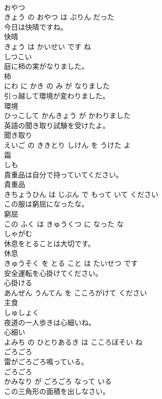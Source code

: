 \documentclass[8pt]{extreport}
\begin{document}
\begin{CJK}{UTF8}{min}
\\	おやつ 
\\	きょう の おやつ は ぷりん だった			
\\	今日は快晴ですね。	
\\	快晴 
\\	きょう は かいせい です ね			
\\	しつこい	
\\	庭に柿の実がなりました。	
\\	柿 
\\	にわ に かき の み が なりました			
\\	引っ越して環境が変わりました。	
\\	環境 
\\	ひっこして かんきょう が かわりました			
\\	英語の聞き取り試験を受けたよ。	
\\	聞き取り 
\\	えいご の ききとり しけん を うけた よ			
\\	霜	
\\	しも			
\\	貴重品は自分で持っていてください。	
\\	貴重品 
\\	きちょうひん は じぶん で もって いて ください			
\\	この服は窮屈になったな。	
\\	窮屈 
\\	この ふく は きゅうくつ に なった な			
\\	しゃがむ	
\\	休息をとることは大切です。	
\\	休息 
\\	きゅうそく を とる こと は たいせつ です			
\\	安全運転を心掛けてください。	
\\	心掛ける 
\\	あんぜん うんてん を こころがけて ください			
\\	主食	
\\	しゅしょく			
\\	夜道の一人歩きは心細いね。	
\\	心細い 
\\	よみち の ひとりあるき は こころぼそい ね			
\\	ごろごろ	
\\	雷がごろごろ鳴っている。	
\\	ごろごろ 
\\	かみなり が ごろごろ なって いる			
\\	この三角形の面積を出しなさい。	

\end{CJK}
\end{document}
